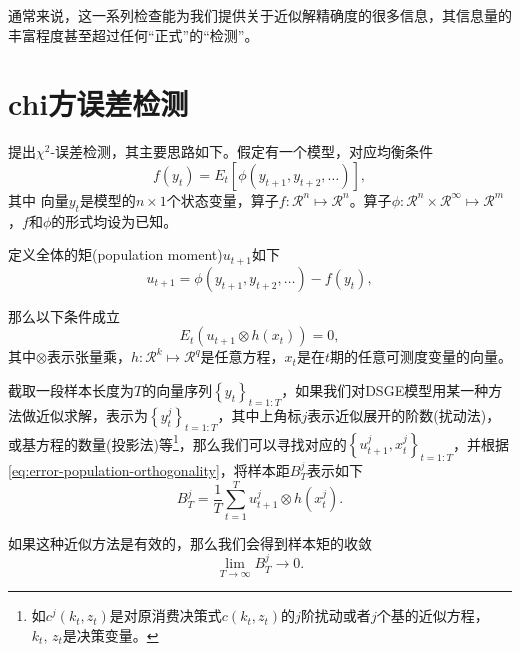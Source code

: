 通常来说，这一系列检查能为我们提供关于近似解精确度的很多信息，其信息量的丰富程度甚至超过任何“正式”的“检测”。

\section{chi方误差检测}
\label{sec:error-chi-test}
\cite{denHaan:1994ej}提出$\chi^{2}$-误差检测，其主要思路如下。假定有一个模型，对应均衡条件
\begin{equation*}
  f \left( y_{t} \right) = E_{t} \left[ \phi \left( y_{t+1}, y_{t+2}, \ldots \right)\right],
\end{equation*}
其中
向量$y_{t}$是模型的$n \times 1$个状态变量，算子$f: \mathcal{R}^{n} \mapsto \mathcal{R}^{n}$。算子$\phi: \mathcal{R}^{n} \times \mathcal{R}^{\infty} \mapsto \mathcal{R}^{m}$，$f$和$\phi$的形式均设为已知。

定义全体的矩(population moment)$u_{t+1}$如下
\begin{equation}
    \label{eq:error-population-moment}
  u_{t+1} = \phi \left( y_{t+1}, y_{t+2}, \ldots \right) - f(y_{t}),
\end{equation}

那么以下条件成立
\begin{equation}
  \label{eq:error-population-orthogonality}
  E_{t} \left( u_{t+1} \otimes h \left( x_{t} \right) \right) =0,
\end{equation}
其中$\otimes$表示张量乘，$h:\mathcal{R}^{k} \mapsto \mathcal{R}^{q}$是任意方程，$x_{t}$是在$t$期的任意可测度变量的向量。

截取一段样本长度为$T$的向量序列$\left\{ y_{t} \right\}_{t=1:T}$，如果我们对DSGE模型用某一种方法做近似求解，表示为$\left\{ y_{t}^{j} \right\}_{t=1:T}$，其中上角标$j$表示近似展开的阶数(扰动法)，或基方程的数量(投影法)等\footnote{
如$c^{j} \left( k_{t}, z_{t} \right)$是对原消费决策式$c \left( k_{t}, z_{t} \right)$的$j$阶扰动或者$j$个基的近似方程，$k_{t}, \, z_{t}$是决策变量。}，那么我们可以寻找对应的$\left\{u_{t+1}^{j}, x_{t}^{j} \right\}_{t=1:T}$，并根据\eqref{eq:error-population-orthogonality}，将样本距$B_{T}^{j}$表示如下
\begin{equation}
  \label{eq:error-sample-moment}
  B_{T}^{j} = \frac{1}{T} \sum_{t=1}^{T} u_{t+1}^{j} \otimes h \left( x_{t}^{j} \right).
\end{equation}

如果这种近似方法是有效的，那么我们会得到样本矩的收敛
\begin{equation*}
  \lim_{T \rightarrow \infty} B_{T}^{j} \rightarrow 0.
\end{equation*}


